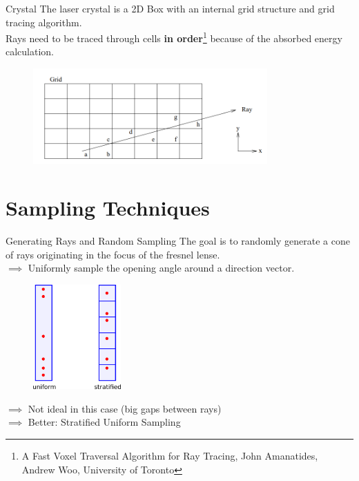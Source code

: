 \documentclass[aspectratio=43,t]{beamer}
\begin{document}
    \begin{frame}[fragile]{Crystal}
			The laser crystal is a 2D Box with an internal grid structure and grid tracing algorithm.\\
			Rays need to be traced through cells \textbf{in order}\footnote{A Fast Voxel Traversal Algorithm for Ray Tracing, John Amanatides, Andrew Woo, University of Toronto} because 
			of the absorbed energy calculation.\\

			\begin{figure}
			\centering
			\includegraphics[width=0.8\textwidth]{images/grid.png}
			\end{figure}


    \end{frame}

	\section{Sampling Techniques}

    \begin{frame}[fragile]{Generating Rays and Random Sampling}
		The goal is to randomly generate a cone of rays originating in the focus
		of the fresnel lense.\\
		\bigskip
		$\implies$ Uniformly sample the opening angle around a direction vector.

		\begin{figure}
		\centering
		\includegraphics[width=0.3\textwidth]{images/stratified.png}
		\end{figure}

		\bigskip
		$\implies$ Not ideal in this case (big gaps between rays)\\
		$\implies$ Better: Stratified Uniform Sampling
		\end{frame}
\end{document}
